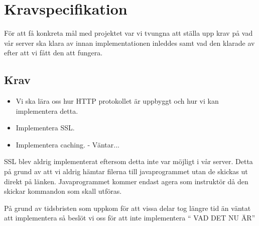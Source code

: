 \section{Kravspecifikation}
För att få konkreta mål med projektet var vi tvungna att ställa upp krav på vad vår server ska klara av innan implementationen inleddes samt vad den klarade av efter att vi fått den att fungera. 

\subsection{Krav}

\begin{itemize}

\item{Vi ska lära oss hur HTTP protokollet är uppbyggt och hur vi kan implementera detta.}
\item{Implementera SSL.}
\item{Implementera caching. - Väntar...}

\end{itemize}

SSL blev aldrig implementerat eftersom detta inte var möjligt i vår server. Detta på grund av att vi aldrig hämtar filerna till javaprogrammet utan de skickas ut direkt på länken. Javaprogrammet kommer endast agera som instruktör då den skickar kommandon som skall utföras. 

På grund av tidsbristen som uppkom för att vissa delar tog längre tid än väntat att implementera så beslöt vi oss för att inte implementera “ VAD DET NU ÄR”
